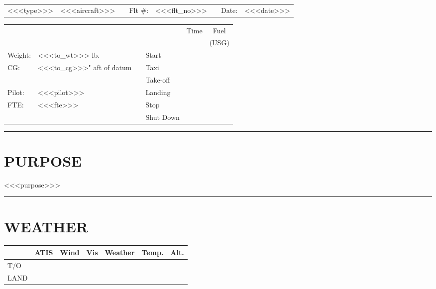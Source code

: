 \documentclass[14pt,halfparskip]{scrartcl}
\newlength{\colOne}
\newlength{\colTwo}
\newlength{\colThree}
\newlength{\colFour}
\newlength{\colSix}
\newlength{\colSeven}
\begin{document}

\noindent\begin{tabularx}{\linewidth - 10 pt}{llXrlXrl}
  <<<type>>>&<<<aircraft>>>&&Flt \#:&<<<flt_no>>>&&Date:&<<<date>>>
  \end{tabularx}
  
\noindent\begin{tabularx}{\linewidth - 10 pt}{llX|l|c|c|}
  \cline{4-6}
  &&&&Time&Fuel\\
  &&&&&(USG)\\
  \cline{4-6}
  Weight:&<<<to_wt>>> lb.&&Start&&\\
  \cline{4-6}
  CG:&<<<to_cg>>>" aft of datum&&Taxi&&\\
  \cline{4-6}
  &&&Take-off&&\\
  \cline{4-6}
  Pilot:&<<<pilot>>>&&Landing&&\\
  \cline{4-6}
  FTE:&<<<fte>>>&&Stop&&\\
  \cline{4-6}
  &&&Shut Down&&\\
  \cline{4-6}
  \end{tabularx}

\noindent\rule{\linewidth}{1mm}
 \section*{PURPOSE}
    <<<purpose>>>
  
\noindent\rule{\linewidth}{1mm}
\section*{WEATHER}
\settowidth{}
\settowidth{}
\settowidth{}
\settowidth{}
\settowidth{}
\settowidth{}
\noindent\begin{tabularx}{\linewidth - 10 pt}{|p{\colOne}|p{\colTwo}|p{\colThree}|p{\colFour}|X|p{\colSix}|p{\colSeven}|}
  \hline
  &ATIS&Wind&Vis&Weather&Temp.&Alt.\\
  \hline
  \hline
  T/O&&&&&&\\
  \hline
  LAND&&&&&&\\
  \hline
  \end{tabularx}
  
\end{document}
